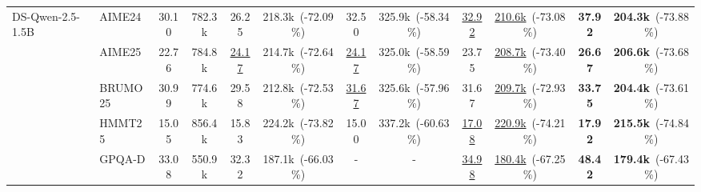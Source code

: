 \documentclass[11pt]{article}
\theoremstyle{plain}
\begin{document}
\begin{table}[ht!]
{\begin{tabular}{llcc cc cc cc cc}
\midrule
\multirow{5}{*}{DS-Qwen-2.5-1.5B} 
& AIME24    & \cellcolor{mygreen1}30.10 & 782.3k  & \cellcolor{mygreen1}26.25 & 218.3k~(-72.09\%)  & \cellcolor{mygreen2}32.50 & 325.9k~(-58.34\%) & \cellcolor{mygreen2}\underline{32.92} & \underline{210.6k}~(-73.08\%)    & \cellcolor{mygreen3}\textbf{37.92} & \textbf{204.3k}~(-73.88\%)\\
& AIME25    & \cellcolor{mygreen1}22.76 & 784.8k  & \cellcolor{mygreen2}\underline{24.17} & 214.7k~(-72.64\%)  & \cellcolor{mygreen2}\underline{24.17} & 325.0k~(-58.59\%) & \cellcolor{mygreen2}23.75 & \underline{208.7k}~(-73.40\%)    & \cellcolor{mygreen3}\textbf{26.67} & \textbf{206.6k}~(-73.68\%)\\
& BRUMO25   & \cellcolor{mygreen2}30.99 & 774.6k  & \cellcolor{mygreen1}29.58 & 212.8k~(-72.53\%)  & \cellcolor{mygreen2}\underline{31.67} & 325.6k~(-57.96\%) & \cellcolor{mygreen2}31.67 & \underline{209.7k}~(-72.93\%)    & \cellcolor{mygreen3}\textbf{33.75} & \textbf{204.4k}~(-73.61\%) \\
& HMMT25    & \cellcolor{mygreen1}15.05 & 856.4k  & \cellcolor{mygreen1}15.83 & 224.2k~(-73.82\%)  & \cellcolor{mygreen1}15.00 & 337.2k~(-60.63\%) & \cellcolor{mygreen2}\underline{17.08} & \underline{220.9k}~(-74.21\%)    & \cellcolor{mygreen3}\textbf{17.92} & \textbf{215.5k}~(-74.84\%)\\
& GPQA-D    & \cellcolor{mygreen2}33.08 & 550.9k  & \cellcolor{mygreen1}32.32 & 187.1k~(-66.03\%)  & - & - & \cellcolor{mygreen2}\underline{34.98} & \underline{180.4k}~(-67.25\%)    & \cellcolor{mygreen3}\textbf{48.42} & \textbf{179.4k}~(-67.43\%) \\


\end{tabular}}
\end{table}
\end{document}
